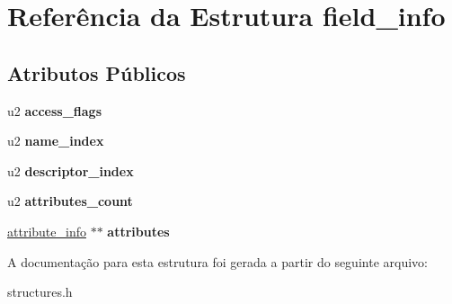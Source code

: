 \hypertarget{structfield__info}{}\section{Referência da Estrutura field\+\_\+info}
\label{structfield__info}
\subsection*{Atributos Públicos}
\begin{DoxyCompactItemize}
\item 
\mbox{\label{structfield__info_aa622dc9a5b5353d2f3eb2f416dacab4b}} 
u2 {\bfseries access\+\_\+flags}
\item 
\mbox{\label{structfield__info_a425e3ae85badd81c67ef00acca85ad9e}} 
u2 {\bfseries name\+\_\+index}
\item 
\mbox{\label{structfield__info_a12dd492b7fb1d61da1ac14938d97b07f}} 
u2 {\bfseries descriptor\+\_\+index}
\item 
\mbox{\label{structfield__info_a83bfa4ff84a608e3dbd1c3968ebe1b80}} 
u2 {\bfseries attributes\+\_\+count}
\item 
\mbox{\label{structfield__info_a754de0f0fd6e62c413cca2979ca5debd}} 
\hyperlink{structattribute__info}{attribute\+\_\+info} $\ast$$\ast$ {\bfseries attributes}
\end{DoxyCompactItemize}


A documentação para esta estrutura foi gerada a partir do seguinte arquivo\+:\begin{DoxyCompactItemize}
\item 
structures.\+h\end{DoxyCompactItemize}
